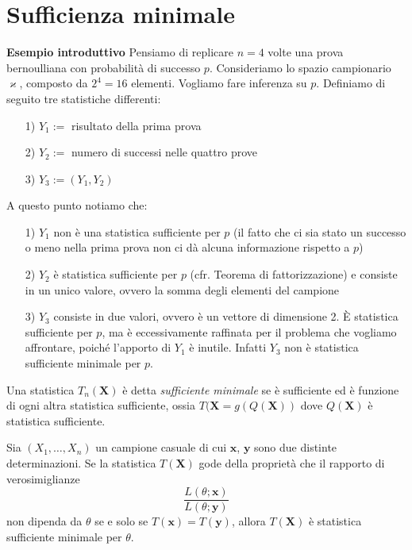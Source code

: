 
\section{Sufficienza minimale}

\textbf{Esempio introduttivo} Pensiamo di replicare $n=4$ volte una prova bernoulliana con probabilità di successo $p$. Consideriamo lo spazio campionario $\varkappa$, composto da $2^4=16$ elementi. Vogliamo fare inferenza su $p$. Definiamo di seguito tre statistiche differenti:

\begin{enumerate}
\item [1)] $Y_1 := $ risultato della prima prova
\item [2)] $Y_2 := $ numero di successi nelle quattro prove
\item [3)] $Y_3 := (Y_1,Y_2)$
\end{enumerate}

A questo punto notiamo che:

\begin{enumerate}
\item [1)] $Y_1$ non è una statistica sufficiente per $p$ (il fatto che ci sia stato un successo o meno nella prima prova non ci dà alcuna informazione rispetto a $p$)
\item [2)] $Y_2$ è statistica sufficiente per $p$ (cfr. Teorema di fattorizzazione) e consiste in un unico valore, ovvero la somma degli elementi del campione
\item [3)] $Y_3$ consiste in due valori, ovvero è un vettore di dimensione 2. È statistica sufficiente per $p$, ma è eccessivamente raffinata per il problema che vogliamo affrontare, poiché l'apporto di $Y_1$ è inutile. Infatti $Y_3$ non è statistica sufficiente minimale per $p$.
\end{enumerate}

\begin{dfn}
  Una statistica \(T_n(\mathbf{X})\) è detta \emph{sufficiente minimale} se è
  sufficiente ed è funzione di ogni altra statistica sufficiente, ossia
  \(T(\mathbf{X} = g(Q(\mathbf{X}))\) dove \(Q(\mathbf{X})\) è statistica
  sufficiente.
\end{dfn}

\begin{thm}
  Sia \((X_1,\dotsc,X_n)\) un campione casuale di cui \(\mathbf{x}\),
  \(\mathbf{y}\) sono due distinte determinazioni. Se la statistica
  \(T(\mathbf{X})\) gode della proprietà che il rapporto di verosimiglianze
  \begin{equation*}
    \frac{L(\theta;\mathbf{x})}{L(\theta;\mathbf{y})}
  \end{equation*}
  non dipenda da \(\theta\) se e solo se \(T(\mathbf{x})=T(\mathbf{y})\),
  allora \(T(\mathbf{X})\) è statistica sufficiente minimale per \(\theta\).
\end{thm}

